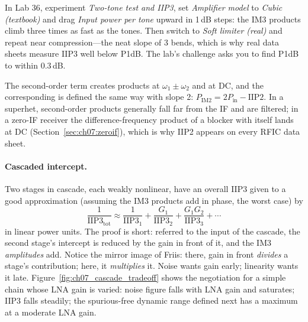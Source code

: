 \begin{tryit}
In Lab 36, experiment \emph{Two-tone test and IIP3}, set \emph{Amplifier model} to \emph{Cubic
(textbook)} and drag \emph{Input power per tone} upward in 1\,dB steps: the IM3 products climb three
times as fast as the tones. Then switch to \emph{Soft limiter (real)} and repeat near compression---the
neat slope of 3 bends, which is why real data sheets measure IIP3 well below P1dB. The lab's challenge
asks you to find P1dB to within 0.3\,dB.
\end{tryit}

The second-order term creates products at $\omega_1\pm\omega_2$ and at DC, and the corresponding
 is defined the same way with slope 2: $P_{\text{IM2}}=2P_{\text{in}}-\text{IIP2}$. In a
superhet, second-order products generally fall far from the IF and are filtered; in a zero-IF receiver
the difference-frequency product of a blocker with itself lands at DC (Section~\ref{sec:ch07:zeroif}),
which is why IIP2 appears on every RFIC data sheet.


\paragraph{Cascaded intercept.} Two stages in cascade, each weakly nonlinear, have an overall IIP3 given
to a good approximation (assuming the IM3 products add in phase, the worst case) by
\begin{equation}
\frac{1}{\text{IIP3}_{\text{tot}}}\approx\frac{1}{\text{IIP3}_1}+\frac{G_1}{\text{IIP3}_2}+\frac{G_1G_2}{\text{IIP3}_3}+\cdots
\label{eq:ch07:iip3cascade}
\end{equation}
in linear power units. The proof is short: referred to the input of the cascade, the second stage's
intercept is reduced by the gain in front of it, and the IM3 \emph{amplitudes} add. Notice the mirror
image of Friis: there, gain in front \emph{divides} a stage's contribution; here, it \emph{multiplies}
it. Noise wants gain early; linearity wants it late. Figure~\ref{fig:ch07_cascade_tradeoff} shows the
negotiation for a simple chain whose LNA gain is varied: noise figure falls with LNA gain and
saturates; IIP3 falls steadily; the spurious-free dynamic range defined next has a maximum at a moderate
LNA gain.

